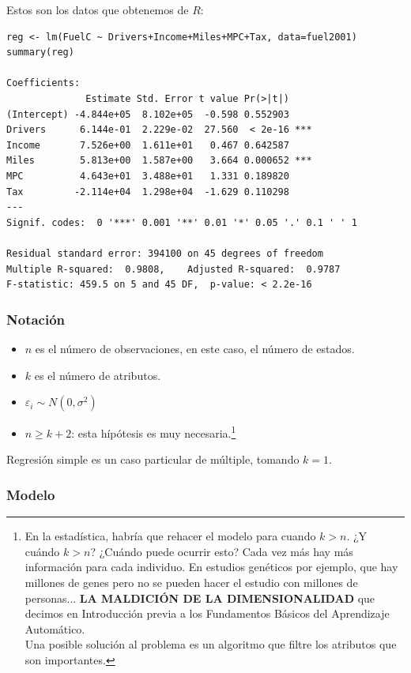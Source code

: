 Estos son los datos que obtenemos de $R$:

\begin{lstlisting}[style=mystyle]
reg <- lm(FuelC ~ Drivers+Income+Miles+MPC+Tax, data=fuel2001)
summary(reg)

Coefficients:
              Estimate Std. Error t value Pr(>|t|)
(Intercept) -4.844e+05  8.102e+05  -0.598 0.552903
Drivers      6.144e-01  2.229e-02  27.560  < 2e-16 ***
Income       7.526e+00  1.611e+01   0.467 0.642587
Miles        5.813e+00  1.587e+00   3.664 0.000652 ***
MPC          4.643e+01  3.488e+01   1.331 0.189820
Tax         -2.114e+04  1.298e+04  -1.629 0.110298
---
Signif. codes:  0 '***' 0.001 '**' 0.01 '*' 0.05 '.' 0.1 ' ' 1

Residual standard error: 394100 on 45 degrees of freedom
Multiple R-squared:  0.9808,	Adjusted R-squared:  0.9787
F-statistic: 459.5 on 5 and 45 DF,  p-value: < 2.2e-16

\end{lstlisting}

\subsubsection{Notación}


\begin{itemize}
	\item $n$ es el número de observaciones, en este caso, el número de estados.
	\item $k$ es el número de atributos.
	\item $ε_i \sim N(0,σ^2)$
	\item $n\geq k+2$: esta hípótesis  es muy necesaria.\footnote{En la estadística, habría que rehacer el modelo para cuando $k>n$. ¿Y cuándo $k>n$? ¿Cuándo puede ocurrir esto? Cada vez más hay más información para cada individuo. En estudios genéticos por ejemplo, que hay millones de genes pero no se pueden hacer el estudio con millones de personas... \textbf{LA MALDICIÓN DE LA DIMENSIONALIDAD} que decimos en Introducción previa a los Fundamentos Básicos del Aprendizaje Automático.\\ Una posible solución al problema es un algoritmo que filtre los atributos que son importantes.}
\end{itemize}

Regresión simple es un caso particular de múltiple, tomando $k=1$.

\subsubsection{Modelo}

